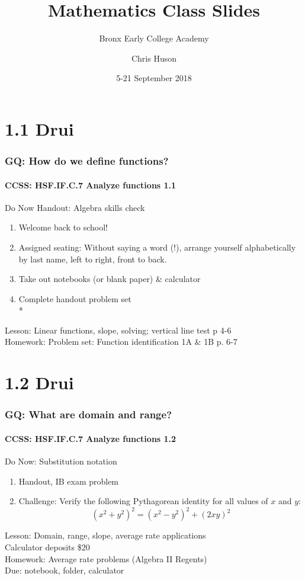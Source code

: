 \documentclass{beamer}
\title{Mathematics Class Slides}
\subtitle{Bronx Early College Academy}
\author{Chris Huson}
\date{5-21 September 2018}
\begin{document}
\frame{\titlepage}


  \section{1.1 Drui}
  \frame
  {
    \frametitle{GQ: How do we define functions?}
    \framesubtitle{CCSS: HSF.IF.C.7 Analyze functions    \alert{1.1}}

    \begin{block}{Do Now Handout: Algebra skills check}
    \begin{enumerate}
        \item Welcome back to school!
        \item Assigned seating: \alert{Without saying a word (!),} arrange yourself alphabetically by last name, left to right, front to back.
        \item Take out notebooks (or blank paper) \& calculator
        \item Complete handout problem set\\*
    \end{enumerate}
    \end{block}
    Lesson: Linear functions, slope, solving; vertical line test p 4-6 \\%
    Homework: Problem set: Function identification 1A \& 1B p. 6-7
  }

  \section{1.2 Drui}
  \frame
  {
    \frametitle{GQ: What are domain and range?}
    \framesubtitle{CCSS: HSF.IF.C.7 Analyze functions   \alert{1.2}}

    \begin{block}{Do Now: Substitution notation}
    \begin{enumerate}
      \item Handout, IB exam problem
      \item Challenge: %
        Verify the following Pythagorean identity for all values of $x$ and $y$:
        \[(x^2+y^2)^2=(x^2-y^2)^2+(2xy)^2\]
    \end{enumerate}
    \end{block}
    Lesson: Domain, range, slope, average rate applications\\[5pt]
    Calculator deposits \$20
    \\[5pt]
    Homework: Average rate problems (Algebra II Regents)\\
    Due: notebook, folder, calculator
  }
\end{document}
